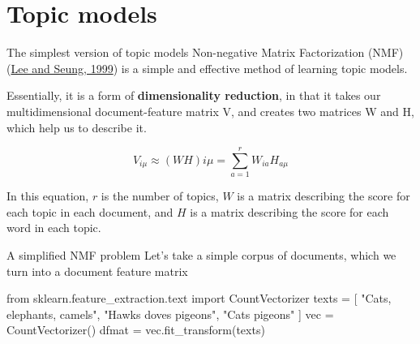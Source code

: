 \documentclass[
  10pt,
  ignorenonframetext,
  aspectratio=169]{beamer}
\newenvironment{Shaded}{\begin{snugshade}}{\end{snugshade}}
\newcommand{\ImportTok}[1]{\textcolor[rgb]{0.80,0.80,0.80}{#1}}
\newcommand{\NormalTok}[1]{\textcolor[rgb]{0.80,0.80,0.80}{#1}}
\newcommand{\OperatorTok}[1]{\textcolor[rgb]{0.94,0.94,0.82}{#1}}
\newcommand{\StringTok}[1]{\textcolor[rgb]{0.80,0.58,0.58}{#1}}
\begin{document}
\hypertarget{topic-models}{%
\section{Topic models}\label{topic-models}}

\begin{frame}{The simplest version of topic models}
\protect\hypertarget{the-simplest-version-of-topic-models}{}
Non-negative Matrix Factorization (NMF)
(\href{https://www.nature.com/articles/44565}{Lee and Seung, 1999}) is a
simple and effective method of learning topic models.

Essentially, it is a form of \textbf{dimensionality reduction}, in that
it takes our multidimensional document-feature matrix V, and creates two
matrices W and H, which help us to describe it.

\[ V_{i\mu} \approx (WH){i\mu} =\sum_{a=1}^{r}W_{ia}H_{a\mu} \]

In this equation, \(r\) is the number of topics, \(W\) is a matrix
describing the score for each topic in each document, and \(H\) is a
matrix describing the score for each word in each topic.
\end{frame}

\begin{frame}[fragile]{A simplified NMF problem}
\protect\hypertarget{a-simplified-nmf-problem}{}
Let's take a simple corpus of documents, which we turn into a document
feature matrix

\medskip

\scriptsize

\begin{Shaded}
\begin{Highlighting}[]
\ImportTok{from}\NormalTok{ sklearn.feature\_extraction.text }\ImportTok{import}\NormalTok{ CountVectorizer}
\NormalTok{texts }\OperatorTok{=}\NormalTok{ [}
    \StringTok{"Cats, elephants, camels"}\NormalTok{,}
    \StringTok{"Hawks doves pigeons"}\NormalTok{,}
    \StringTok{"Cats pigeons"}
\NormalTok{]}
\NormalTok{vec }\OperatorTok{=}\NormalTok{ CountVectorizer()}
\NormalTok{dfmat }\OperatorTok{=}\NormalTok{ vec.fit\_transform(texts)}
\end{Highlighting}
\end{Shaded}
\end{frame}
\end{document}
